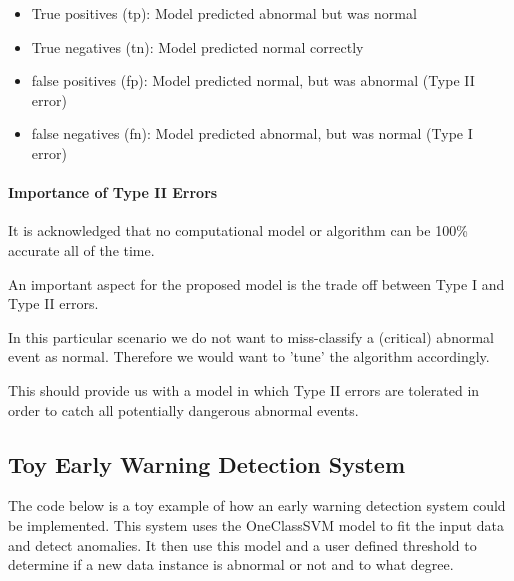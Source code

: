 \documentclass[11pt]{article}
\begin{document}
\begin{itemize}
\item
  True positives (tp): Model predicted abnormal but was normal
\item
  True negatives (tn): Model predicted normal correctly
\item
  false positives (fp): Model predicted normal, but was abnormal (Type
  II error)
\item
  false negatives (fn): Model predicted abnormal, but was normal (Type I
  error)
\end{itemize}

\paragraph{Importance of Type II
Errors}\label{importance-of-type-ii-errors}

It is acknowledged that no computational model or algorithm can be 100\%
accurate all of the time.

An important aspect for the proposed model is the trade off between Type
I and Type II errors.

In this particular scenario we do not want to miss-classify a (critical)
abnormal event as normal. Therefore we would want to 'tune' the
algorithm accordingly.

This should provide us with a model in which Type II errors are
tolerated in order to catch all potentially dangerous abnormal events.

    \subsection{Toy Early Warning Detection
System}\label{toy-early-warning-detection-system}

The code below is a toy example of how an early warning detection system
could be implemented. This system uses the OneClassSVM model to fit the
input data and detect anomalies. It then use this model and a user
defined threshold to determine if a new data instance is abnormal or not
and to what degree.
\end{document}
